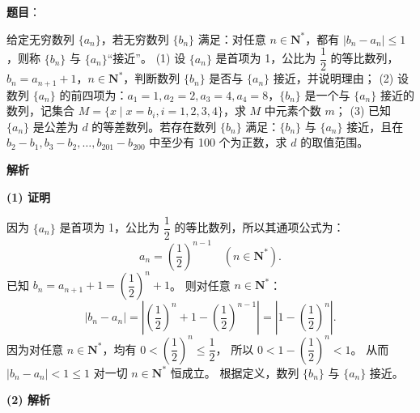 \begin{answer}

\textbf{题目}：

给定无穷数列 $\{a_n\}$，若无穷数列 $\{b_n\}$ 满足：对任意 $n \in \mathbf{N}^*$，都有 $|b_n - a_n| \le 1$，则称 $\{b_n\}$ 与 $\{a_n\}$“接近”。
(1) 设 $\{a_n\}$ 是首项为 1，公比为 $\dfrac{1}{2}$ 的等比数列，$b_n = a_{n+1} + 1$，$n \in \mathbf{N}^*$，判断数列 $\{b_n\}$ 是否与 $\{a_n\}$ 接近，并说明理由；
(2) 设数列 $\{a_n\}$ 的前四项为：$a_1 = 1, a_2 = 2, a_3 = 4, a_4 = 8$，$\{b_n\}$ 是一个与 $\{a_n\}$ 接近的数列，记集合 $M = \{x \mid x = b_i, i = 1, 2, 3, 4\}$，求 $M$ 中元素个数 $m$；
(3) 已知 $\{a_n\}$ 是公差为 $d$ 的等差数列。若存在数列 $\{b_n\}$ 满足：$\{b_n\}$ 与 $\{a_n\}$ 接近，且在 $b_2 - b_1, b_3 - b_2, \dots, b_{201} - b_{200}$ 中至少有 100 个为正数，求 $d$ 的取值范围。

\textbf{解析}

\textbf{(1) 证明}

因为 $\{a_n\}$ 是首项为 1，公比为 $\dfrac{1}{2}$ 的等比数列，所以其通项公式为：
\nopagebreak[4]
\[a_n = \left(\frac{1}{2}\right)^{n-1} \quad (n \in \mathbf{N}^*).\]
已知 $b_n = a_{n+1} + 1 = \left(\dfrac{1}{2}\right)^n + 1$。
则对任意 $n \in \mathbf{N}^*$：
\nopagebreak[4]
\[|b_n - a_n| = \left|\left(\frac{1}{2}\right)^n + 1 - \left(\frac{1}{2}\right)^{n-1}\right| = \left|1 - \left(\frac{1}{2}\right)^n\right|.\]
因为对任意 $n \in \mathbf{N}^*$，均有 $0 < \left(\dfrac{1}{2}\right)^n \le \dfrac{1}{2}$，
所以 $0 < 1 - \left(\dfrac{1}{2}\right)^n < 1$。
从而 $|b_n - a_n| < 1 \le 1$ 对一切 $n \in \mathbf{N}^*$ 恒成立。
根据定义，数列 $\{b_n\}$ 与 $\{a_n\}$ 接近。

\textbf{(2) 解析}


\end{answer}
